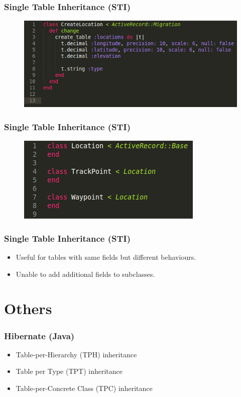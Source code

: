 \documentclass{beamer}
\begin{document}
\begin{frame}
	\frametitle{Single Table Inheritance (STI)}
	\begin{figure}
		\centering
		\includegraphics[scale=0.5]{resources/rails/migration.png}
	\end{figure}
\end{frame}

\begin{frame}
	\frametitle{Single Table Inheritance (STI)}
	\begin{figure}
		\centering
		\includegraphics[scale=0.6]{resources/rails/classes.png}
	\end{figure}
\end{frame}

\begin{frame}
	\frametitle{Single Table Inheritance (STI)}
	
	\begin{itemize}
		\item Useful for tables with same fields but different behaviours.
		\item Unable to add additional fields to subclasses.
	\end{itemize}
\end{frame}

\section{Others}

\begin{frame}
	\frametitle{Hibernate (Java)}
	
	\begin{itemize}
		\item Table-per-Hierarchy (TPH) inheritance
		\item Table per Type (TPT) inheritance
		\item Table-per-Concrete Class (TPC) inheritance
	\end{itemize}

\end{frame}
\end{document}
